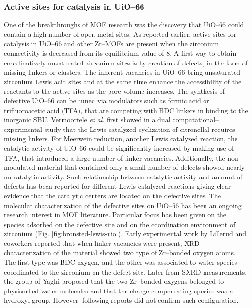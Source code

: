\subsubsection*{Active sites for catalysis in UiO--66}
One of the breakthroughs of MOF research was the discovery that UiO--66 could contain a high number of open metal sites. As reported earlier, active sites for catalysis in UiO--66 and other Zr--MOFs are present when the zirconium connectivity is decreased from its equilibrium value of 8.
\npar
A first way to obtain coordinatively unsaturated zirconium sites is by creation of defects, in the form of missing linkers or clusters. The inherent vacancies in UiO--66 bring unsaturated zirconium Lewis acid sites\cite{wu2013unusual, shearer2014tuned, vermoortele2013synthesis, vandichel2015active, liu2016probing} and at the same time enhance the accessibility of the reactants to the active sites as the pore volume increases. The synthesis of defective UiO--66 can be tuned via modulators such as formic acid or trifluoroacetic acid (TFA), that are competing with BDC linkers in binding to the inorganic SBU. 
Vermoortele \textit{et al}. first showed in a dual computational--experimental study that the Lewis catalyzed cyclization of citronellal requires missing linkers\cite{vermoortele2012electronic}. For Meerwein reduction, another Lewis catalyzed reaction, the catalytic activity of UiO--66 could be significantly increased by making use of TFA, that introduced a large number of linker vacancies. Additionally, the non-modulated material that contained only a small number of defects showed nearly no catalytic activity\cite{vermoortele2013synthesis}. Such relationship between catalytic activity and amount of defects has been reported for different Lewis catalyzed reactions giving clear evidence that the catalytic centers are located on the defective sites\cite{vermoortele2012electronic, vermoortele2013synthesis}. 
\npar
The molecular characterization of the defective sites on UiO--66 has been an ongoing research interest in MOF literature. Particular focus has been given on the species adsorbed on the defective site and on the coordination environment of zirconium (Fig. \ref{fig:bronsted-lewis-uio}). Early experimental work by Lillerud and coworkers \cite{oien2014detailed} reported that when linker vacancies were present, XRD characterization of the material showed two type of Zr--bonded oxygen atoms. The first type was BDC oxygen, and the other was associated to water species coordinated to the zirconium on the defect site. Later from SXRD measurements, the group of Yaghi \cite{trickett2015definitive} proposed that the two Zr--bonded oxygens belonged to physisorbed water molecules and that the charge compensating species was a hydroxyl group. However, following reports did not confirm such configuration.

